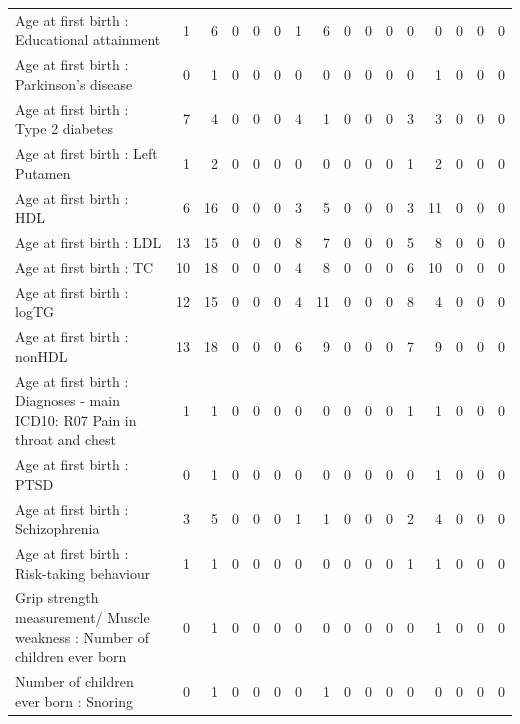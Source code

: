 \begin{table}[ht]
\begin{tabular}{lrrrrrrrrrrrrrrr}
  Age at first birth  : Educational attainment &   1 &   6 &   0 &   0 &   0 &   1 &   6 &   0 &   0 &   0 &   0 &   0 &   0 &   0 &   0 \\ 
  Age at first birth  : Parkinson's disease &   0 &   1 &   0 &   0 &   0 &   0 &   0 &   0 &   0 &   0 &   0 &   1 &   0 &   0 &   0 \\ 
  Age at first birth  : Type 2 diabetes &   7 &   4 &   0 &   0 &   0 &   4 &   1 &   0 &   0 &   0 &   3 &   3 &   0 &   0 &   0 \\ 
  Age at first birth  : Left Putamen &   1 &   2 &   0 &   0 &   0 &   0 &   0 &   0 &   0 &   0 &   1 &   2 &   0 &   0 &   0 \\ 
  Age at first birth  : HDL &   6 &  16 &   0 &   0 &   0 &   3 &   5 &   0 &   0 &   0 &   3 &  11 &   0 &   0 &   0 \\ 
  Age at first birth  : LDL &  13 &  15 &   0 &   0 &   0 &   8 &   7 &   0 &   0 &   0 &   5 &   8 &   0 &   0 &   0 \\ 
  Age at first birth  : TC &  10 &  18 &   0 &   0 &   0 &   4 &   8 &   0 &   0 &   0 &   6 &  10 &   0 &   0 &   0 \\ 
  Age at first birth  : logTG &  12 &  15 &   0 &   0 &   0 &   4 &  11 &   0 &   0 &   0 &   8 &   4 &   0 &   0 &   0 \\ 
  Age at first birth  : nonHDL &  13 &  18 &   0 &   0 &   0 &   6 &   9 &   0 &   0 &   0 &   7 &   9 &   0 &   0 &   0 \\ 
  Age at first birth  : Diagnoses - main ICD10: R07 Pain in throat and chest &   1 &   1 &   0 &   0 &   0 &   0 &   0 &   0 &   0 &   0 &   1 &   1 &   0 &   0 &   0 \\ 
  Age at first birth  : PTSD &   0 &   1 &   0 &   0 &   0 &   0 &   0 &   0 &   0 &   0 &   0 &   1 &   0 &   0 &   0 \\ 
  Age at first birth  : Schizophrenia &   3 &   5 &   0 &   0 &   0 &   1 &   1 &   0 &   0 &   0 &   2 &   4 &   0 &   0 &   0 \\ 
  Age at first birth  : Risk-taking behaviour &   1 &   1 &   0 &   0 &   0 &   0 &   0 &   0 &   0 &   0 &   1 &   1 &   0 &   0 &   0 \\ 
  Grip strength measurement/ Muscle weakness : Number of children ever born  &   0 &   1 &   0 &   0 &   0 &   0 &   0 &   0 &   0 &   0 &   0 &   1 &   0 &   0 &   0 \\ 
  Number of children ever born  : Snoring &   0 &   1 &   0 &   0 &   0 &   0 &   1 &   0 &   0 &   0 &   0 &   0 &   0 &   0 &   0 \\ 

\end{tabular}
\end{table}
